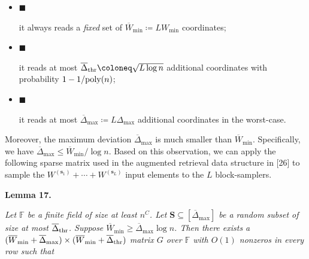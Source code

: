 \documentclass[10pt,a4paper]{article}
\begin{document}
\begin{itemize}


\item[] 
$\blacksquare$ 


it always reads a \emph{fixed} set of $\overline{W}_{\min}\coloneq LW_{\min}$ coordinates;\par





\item[] 
$\blacksquare$ 


it reads at most $\overline{\Delta}_{{\rm thr}}\coloneq\sqrt{L\log n}$ additional coordinates with probability $1-1/\textnormal{poly}(n)$;\par





\item[] 
$\blacksquare$ 


it reads at most $\overline{\Delta}_{\max}\coloneq L\Delta_{\max}$ additional coordinates in the worst-case.\par





\end{itemize}


Moreover, the maximum deviation $\overline{\Delta}_{\max}$ is much smaller than $\overline{W}_{\min}$.
Specifically, we have $\overline{\Delta}_{\max}\leq\overline{W}_{\min}/\log n$.
Based on this observation, we can apply the following sparse matrix used in the augmented retrieval data structure in [26] to sample the $W^{(\boldsymbol{s}_{1})}+\cdots+W^{(\boldsymbol{s}_{L})}$ input elements to the $L$ block-samplers.\par





\par\medskip\noindent\textbf{
\textbf{Lemma 17}\textbf{.}
}\par



\emph{Let $\mathbb{F}$ be a finite field of size at least $n^{C}$.
Let $\boldsymbol{S}\subseteq[\overline{\Delta}_{\max}]$ be a random subset of size at most $\overline{\Delta}_{{\rm thr}}$.
Suppose $\overline{W}_{\min}\geq\overline{\Delta}_{\max}\log n$.
Then there exists a $(\overline{W}_{\min}+\overline{\Delta}_{\max})\times(\overline{W}_{\min}+\overline{\Delta}_{{\rm thr}})$ matrix $G$ over $\mathbb{F}$ with $O(1)$ nonzeros in every row such that}\par
\end{document}
